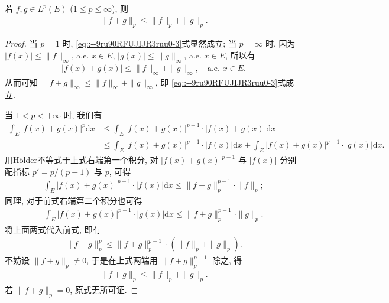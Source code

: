 \documentclass[../../main.tex]{subfiles}%
\begin{document}
\begin{theorem}[Minkowski不等式]\label{theorem:实变函数--Minkowski不等式}
若 $f,g\in L^p(E)$ ($1\leqslant p\leqslant\infty$), 则
\begin{align}\label{eq::--9ru90RFUJIJR3ruu0-3}
\|f+g\|_p \leqslant \|f\|_p + \|g\|_p.
\end{align}
\end{theorem}
\begin{proof}

当 $p=1$ 时, \eqref{eq::--9ru90RFUJIJR3ruu0-3}式显然成立; 当 $p=\infty$ 时, 因为 $|f(x)|\leqslant\|f\|_\infty$, a.e. $x\in E$, $|g(x)|\leqslant\|g\|_\infty$, a.e. $x\in E$, 所以有
\begin{align*}
|f(x)+g(x)|\leqslant\|f\|_\infty + \|g\|_\infty, \quad \text{a.e. } x\in E.
\end{align*}
从而可知 $\|f+g\|_\infty\leqslant\|f\|_\infty+\|g\|_\infty$, 即 \eqref{eq::--9ru90RFUJIJR3ruu0-3}式成立.

当 $1<p<+\infty$ 时, 我们有
\begin{align*}
\int_E |f(x)+g(x)|^p \mathrm{d}x
&\leqslant \int_E |f(x)+g(x)|^{p-1} \cdot |f(x)+g(x)|\mathrm{d}x \\
&\leqslant \int_E |f(x)+g(x)|^{p-1} \cdot |f(x)|\mathrm{d}x + \int_E |f(x)+g(x)|^{p-1} \cdot |g(x)|\mathrm{d}x.
\end{align*}
用Hölder不等式于上式右端第一个积分, 对 $|f(x)+g(x)|^{p-1}$ 与 $|f(x)|$ 分别配指标 $p'=p/(p-1)$ 与 $p$, 可得
\begin{align*}
\int_E |f(x)+g(x)|^{p-1} \cdot |f(x)|\mathrm{d}x \leqslant \|f+g\|_p^{p-1} \cdot \|f\|_p;
\end{align*}
同理, 对于前式右端第二个积分也可得
\begin{align*}
\int_E |f(x)+g(x)|^{p-1} \cdot |g(x)|\mathrm{d}x \leqslant \|f+g\|_p^{p-1} \cdot \|g\|_p.
\end{align*}
将上面两式代入前式, 即有
\begin{align*}
\|f+g\|_p^p \leqslant \|f+g\|_p^{p-1} \cdot (\|f\|_p + \|g\|_p).
\end{align*}
不妨设 $\|f+g\|_p\neq0$, 于是在上式两端用 $\|f+g\|_p^{p-1}$ 除之, 得
\begin{align*}
\|f+g\|_p \leqslant \|f\|_p + \|g\|_p.
\end{align*}
若 $\|f+g\|_p=0$, 原式无所可证.

\end{proof}
\end{document}
